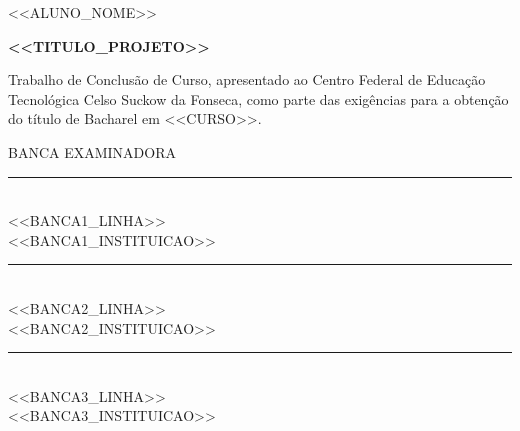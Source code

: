 


\fontsize{14}{14.25}\selectfont

\vspace*{0.15cm}
{\centering <<ALUNO_NOME>>\par}

\vspace{1.66cm}
{\centering\bfseries\fontsize{16}{17}\selectfont <<TITULO_PROJETO>>\par}

\vspace{2.23cm}
\noindent\hspace*{\fill}\begin{minipage}{7cm}
\setlength{\parindent}{0pt}\noindent\justifying
Trabalho de Conclusão de Curso, apresentado ao Centro Federal de Educação Tecnológica Celso Suckow da Fonseca, como parte das exigências para a obtenção do título de Bacharel em <<CURSO>>.
\end{minipage}

\vspace{1.74cm}

\vspace{0.95cm}
{\centering BANCA EXAMINADORA\par}

\vspace{2.53cm}
\noindent\begin{minipage}{\textwidth}
\centering
\rule{9.4cm}{0.4pt}\\
\mbox{<<BANCA1_LINHA>>}\\
\mbox{<<BANCA1_INSTITUICAO>>}
\end{minipage}

\vspace{2.75cm}
\noindent\begin{minipage}{\textwidth}
\centering
\rule{9.4cm}{0.4pt}\\
\mbox{<<BANCA2_LINHA>>}\\
\mbox{<<BANCA2_INSTITUICAO>>}
\end{minipage}

\vspace{2.90cm}
\noindent\begin{minipage}{\textwidth}
\centering
\rule{9.4cm}{0.4pt}\\
\mbox{<<BANCA3_LINHA>>}\\
\mbox{<<BANCA3_INSTITUICAO>>}
\end{minipage}


